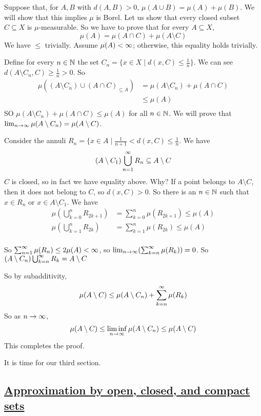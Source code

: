 \documentclass[x11names,reqno,14pt]{extarticle}
\newcommand{\seq}[2][\oo]{_{#2 = 1}^#1}
\newcommand{\bigcupn}[1][\oo]{\bigcup\seq[#1]{n}}
\begin{document}
Suppose that, for $A, B$ with $d(A, B) > 0$, $\mu(A \cup B) = \mu(A) + \mu(B)$. We will show that this implies $\mu$ is Borel. Let us show that every closed subset $C\subseteq X$ is $\mu$-measurable. So we have to prove that for every $A \subseteq X$, 
\[
\mu(A) = \mu(A \cap C) + \mu(A\setminus C)
\]
We have $\leq$ trivially. Assume $\mu(A)<\infty$; otherwise, this equality holds trivially. 

Define for every $n \in \mathbb{N}$ the set $C_n = \{x\in X \mid d(x, C) \leq \frac{1}{n}\}$. We can see $d(A\setminus C_n, C) \geq \frac{1}{n} > 0$. So
\begin{align*}
\mu({(A\setminus C_n)\cup (A \cap C)}_{\subseteq A}) & = \mu(A \setminus C_n) + \mu(A \cap C) \\
& \leq \mu(A)\\
\end{align*}
SO $\mu(A \setminus C_n) + \mu(A \cap C) \leq \mu(A)$ for all $n \in \mathbb{N}$. We will prove that $\lim_{n\to\infty}\mu(A\setminus C_n) = \mu(A \setminus C)$. 

Consider the annuli $R_n = \{x \in A \mid \frac{1}{n + 1} < d(x, C) \leq \frac{1}{n}$. We have
\[
(A\setminus C_1) \bigcupn R_n \subseteq A \setminus C
\]
$C$ is closed, so in fact we have equality above. Why? If a point belongs to $A \setminus C$, then it does not belong to $C$, so $d(x, C) > 0$. So there is an $n\in\mathbb{N}$ such that $x \in R_n$ or $x \in A \setminus C_1$. We have
\begin{align*}
\mu\left(\bigcup_{k=0}^nR_{2k + 1}\right) & = \sum_{k=0}^n\mu(R_{2k + 1})  \leq \mu(A) \\
\mu\left(\bigcup_{k=1}^nR_{2k}\right) & = \sum_{k=1}^n\mu(R_{2k}) \leq \mu(A) \\
\end{align*}

So $\sum\seq{n}\mu(R_n) \leq 2\mu(A)<\oo$, so $\lim_{n\to\infty}(\sum_{k=n}^\infty\mu(R_k)) = 0$. So $(A \setminus C_n) \bigcup_{k=n}^\infty R_k = A \setminus C$

So by subadditivity, 
\[
\mu(A\setminus C) \leq \mu(A\setminus C_n) + \sum_{k=n}^\infty\mu(R_k)
\]
So as $n\to\infty$, 
\[
\mu(A \setminus C) \leq \liminf_{n\to\infty}\mu(A\setminus C_n) \leq \mu(A \setminus C)
\]
This completes the proof. 

It is time for our third section. 

\subsection*{\underline{Approximation by open, closed, and compact sets}}
\end{document}
